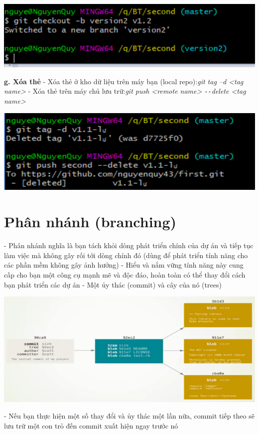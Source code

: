 \documentclass[12pt,a4paper]{report}
\begin{document}
	\includegraphics[width=0.8\linewidth]{screenshot046}

	\label{fig:screenshot046}
\vskip 0.4cm\vskip 0.4cm
{\bf g. Xóa thẻ}\vskip 0.4cm
- Xóa thẻ ở kho dữ liệu trên máy bạn (local repo):{\it  git tag –d <tag name>}\vskip 0.4cm
- Xóa thẻ trên máy chủ lưu trữ:{\it git push <remote name> \texttt{-{}-}delete <tag name>}\vskip 0.4cm

	\includegraphics[width=0.8\linewidth]{screenshot047}
	
	\label{fig:screenshot047}




				
\section{Phân nhánh (branching)}
\hspace{0.6cm}- Phân nhánh nghĩa là bạn tách khỏi dòng phát triển chính của dự án và tiếp tục làm việc mà không gây rối tới dòng chính đó (dùng để phát triển tính năng cho các phần mềm không gây ảnh hưởng)\vskip 0.4cm
- Hiểu và nắm vững tính năng này cung cấp cho bạn một công cụ mạnh mẽ và độc đáo, hoàn toàn có thể thay đổi cách bạn phát triển các dự án\vskip 0.4cm
- Một ủy thác (commit) và cây của nó (trees)\vskip 0.4cm

	\includegraphics[width=0.8\linewidth]{screenshot048}

	\label{fig:screenshot048}
\vskip 0.4cm\vskip 0.4cm
- Nếu bạn thực hiện một số thay đổi và ủy thác một lần nữa, commit tiếp theo sẽ lưu trữ một con trỏ đến commit xuất hiện ngay trước nó\vskip 0.4cm
\end{document}
